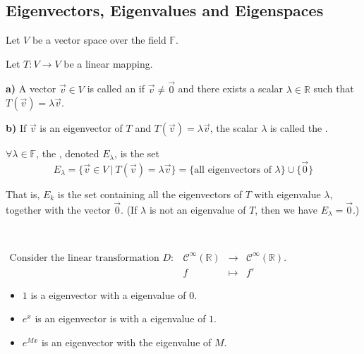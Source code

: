 \documentclass[11pt,fleqn]{book} %
\begin{document}
\subsection{Eigenvectors, Eigenvalues and Eigenspaces}

\setcounter{chapter}{4}
\setcounter{definitionT}{1}
\begin{definition}

    Let $V$ be a vector space over the field $\mathbb{F}$.

    Let $T: V \to V$ be a linear mapping.

    \textbf{a)} A vector $\overrightarrow{v} \in V$ is called an  if $\overrightarrow{v} \neq \overrightarrow{0}$ and there exists a scalar $\lambda \in \mathbb{R}$ such that $T(\overrightarrow{v}) = \lambda \overrightarrow{v}$.

    \textbf{b)} If $\overrightarrow{v}$ is an eigenvector of $T$ and $T(\overrightarrow{v}) = \lambda\overrightarrow{v}$, the scalar $\lambda$ is called the .
\end{definition}

\setcounter{chapter}{4}
\setcounter{definitionT}{5}
\begin{definition}[Eigenspace]

    $\forall \lambda \in \mathbb{F}$, the , denoted $E_\lambda$, is the set $$E_\lambda = \{ \overrightarrow{v} \in V ~|~ T(\overrightarrow{v}) = \lambda \overrightarrow{v} \} = \{ \text{all eigenvectors of } \lambda \} \cup \{ \overrightarrow{0} \}$$

    That is, $E_k$ is the set containing all the eigenvectors of $T$ with eigenvalue $\lambda$, together with the vector $\overrightarrow{0}$. (If $\lambda$ is not an eigenvalue of $T$, then we have $E_\lambda = {\overrightarrow{0}}$.)
\end{definition}
\setcounter{chapter}{3}

\begin{example}
{~~~}

    $\begin{matrix} \text{Consider the linear transformation } D: &\mathcal{C}^\infty(\mathbb{R}) &\to &\mathcal{C}^\infty(\mathbb{R}). \\ &f &\mapsto &f' \end{matrix}$

    \begin{itemize}
        \item $1$ is a eigenvector with a eigenvalue of $0$.

        \item $e^x$ is an eigenvector is with a eigenvalue of $1$.

        \item $e^{Mx}$ is an eigenvector with the eigenvalue of $M$.
    \end{itemize}
\end{example}
\end{document}
